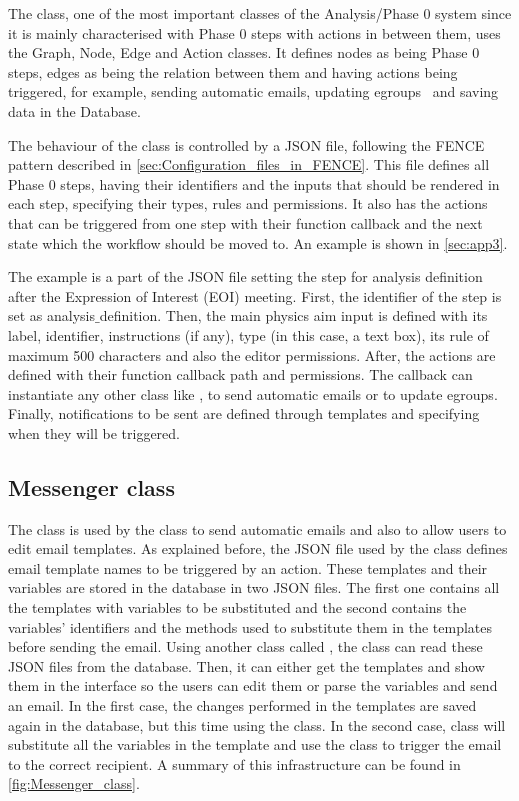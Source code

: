 The  class, one of the most important classes of the Analysis/Phase 0 system since it is mainly characterised with Phase 0 steps with actions in between them, uses the Graph, Node, Edge and Action classes. It defines nodes as being Phase 0 steps, edges as being the relation between them and having actions being triggered, for example, sending automatic emails, updating egroups~\cite{egroups} and saving data in the Database.

The behaviour of the  class is controlled by a JSON file, following the FENCE pattern described in \cref{sec:Configuration_files_in_FENCE}.
This file defines all Phase 0 steps, having their identifiers and the inputs that should be rendered in each step, specifying their types, rules and permissions.
It also has the actions that can be triggered from one step with their function callback and the next state which the workflow should be moved to. An example is shown in \cref{sec:app3}.

The example is a part of the JSON file setting the step for analysis definition
after the Expression of Interest (EOI) meeting.
First, the identifier of the step is set as analysis$\_$definition.
Then, the main physics aim input is defined with its label, identifier, instructions (if any), type (in this case, a text box), its rule of maximum 500 characters and also the editor permissions. After, the actions are defined with their function callback path and permissions.
The callback can instantiate any other class like , to send automatic emails or  to update egroups.
Finally, notifications to be sent are defined through templates and specifying when they will be triggered.

\subsection{Messenger class}
\label{sec:Messenger_class}

The  class is used by the  class to send automatic emails and also to allow users to edit email templates. As explained before, the JSON file used by the  class defines email template names to be triggered by an action.
These templates and their variables are stored in the database in two JSON files.
The first one contains all the templates with variables to be substituted and the second contains the variables' identifiers and the methods used to substitute them in the templates before sending the email.
Using another class called , the  class can read these JSON files from the database.
Then, it can either get the templates and show them in the interface so the users can edit them or parse the variables and send an email.
In the first case, the changes performed in the templates are saved again in the database, but this time using the  class.
In the second case,  class will substitute all the variables in the template and use the  class to trigger the email to the correct recipient.
A summary of this infrastructure can be found in \cref{fig:Messenger_class}. 

